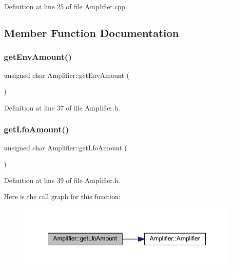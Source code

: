 Definition at line 25 of file Amplifier.\+cpp.



\subsection{Member Function Documentation}
\mbox{\label{class_amplifier_a4cb59ec35a428bf0361799326fbb42c3}} 
\subsubsection{\texorpdfstring{get\+Env\+Amount()}{getEnvAmount()}}
{\footnotesize\ttfamily unsigned char Amplifier\+::get\+Env\+Amount (\begin{DoxyParamCaption}{ }\end{DoxyParamCaption})\hspace{0.3cm}{\ttfamily [inline]}}



Definition at line 37 of file Amplifier.\+h.

\mbox{\label{class_amplifier_aeb4c113b992aae7b6fa96fb7ebf9a5ca}} 
\subsubsection{\texorpdfstring{get\+Lfo\+Amount()}{getLfoAmount()}}
{\footnotesize\ttfamily unsigned char Amplifier\+::get\+Lfo\+Amount (\begin{DoxyParamCaption}{ }\end{DoxyParamCaption})\hspace{0.3cm}{\ttfamily [inline]}}



Definition at line 39 of file Amplifier.\+h.

Here is the call graph for this function\+:
\nopagebreak
\begin{figure}[H]
\begin{center}
\leavevmode
\includegraphics[width=334pt]{de/d01/class_amplifier_aeb4c113b992aae7b6fa96fb7ebf9a5ca_cgraph}
\end{center}
\end{figure}
\mbox{\label{class_amplifier_a3f1ec0c50fdb0adb71e2f7576e38170a}} 
